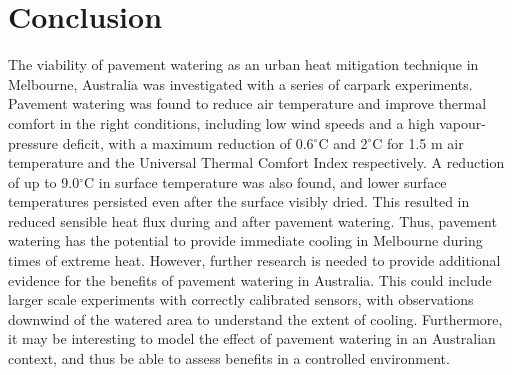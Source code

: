 \documentclass[final,3p,times,authoryear]{elsarticle}
\begin{document}
\section{Conclusion}\label{sec:conclusion}

The viability of pavement watering as an urban heat mitigation technique in Melbourne,
Australia was investigated with a series of carpark experiments. Pavement watering was
found to reduce air temperature and improve thermal comfort in the right conditions,
including low wind speeds and a high vapour-pressure deficit, with a maximum
reduction of 0.6$^{\circ}$C and 2$^{\circ}$C for 1.5 m air temperature and the Universal Thermal
Comfort Index respectively. A reduction of up to 9.0$^{\circ}$C in surface temperature was also
found, and lower surface temperatures persisted even after the surface visibly dried.
This resulted in reduced sensible heat flux during and after pavement watering. Thus,
pavement watering has the potential to provide immediate cooling in Melbourne during times of extreme heat.
However, further research is needed to provide additional evidence for the benefits of pavement watering in Australia. This could include larger scale experiments with correctly calibrated sensors, with observations downwind of the watered area to understand the extent of cooling. Furthermore, it may be interesting to model the effect of pavement watering in an Australian context, and thus be able to assess benefits in a controlled environment.

%
%
%

\end{document}

